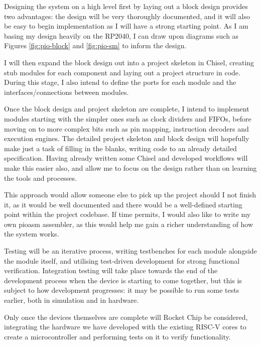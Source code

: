 \documentclass[a4paper,fleqn,12pt]{article}
\begin{document}

Designing the system on a high level first by laying out a block design provides two advantages: the design will be very thoroughly documented, and it will also be easy to begin implementation as I will have a strong starting point. As I am basing my design heavily on the RP2040, I can draw upon diagrams such as Figures \ref{fig:pio-block} and \ref{fig:pio-sm} to inform the design.

I will then expand the block design out into a project skeleton in Chisel, creating stub modules for each component and laying out a project structure in code. During this stage, I also intend to define the ports for each module and the interfaces/connections between modules.

Once the block design and project skeleton are complete, I intend to implement modules starting with the simpler ones such as clock dividers and FIFOs, before moving on to more complex bits such as pin mapping, instruction decoders and execution engines. The detailed project skeleton and block design will hopefully make just a task of filling in the blanks, writing code to an already detailed specification. Having already written some Chisel and developed workflows will make this easier also, and allow me to focus on the design rather than on learning the tools and processes.

This approach would allow someone else to pick up the project should I not finish it, as it would be well documented and there would be a well-defined starting point within the project codebase. If time permits, I would also like to write my own pioasm assembler, as this would help me gain a richer understanding of how the system works.

Testing will be an iterative process, writing testbenches for each module alongside the module itself, and utilising test-driven development for strong functional verification. Integration testing will take place towards the end of the development process when the device is starting to come together, but this is subject to how development progresses: it may be possible to run some tests earlier, both in simulation and in hardware.

Only once the devices themselves are complete will Rocket Chip be considered, integrating the hardware we have developed with the existing RISC-V cores to create a microcontroller and performing tests on it to verify functionality.
\end{document}
